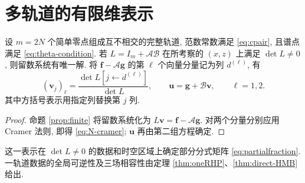 \section{多轨道的有限维表示}
\begin{proposition}[多轨道留数系统的行列式表示]\label{prop:N-algebra}
设 $m=2N$ 个简单零点组成互不相交的完整轨道, 范数常数满足 \eqref{eq:cpair}, 且谱点满足 \eqref{eq:theta-condition}. 若 $L=I_m+\mathcal A\mathcal B$ 在所考察的 $(x,z)$ 上满足 $\det L\ne0$, 则留数系统有唯一解. 将 $\boldsymbol f-\mathcal A\boldsymbol g$ 的第 $\ell$ 个向量分量记为列 $d^{(\ell)}$, 有
\begin{equation}\label{eq:N-cramer}
(\mathbf v_j)_\ell=\dfrac{\det L[j\leftarrow d^{(\ell)}]}{\det L},\qquad
\boldsymbol u=\boldsymbol g+\mathcal B\boldsymbol v,\qquad \ell=1,2.
\end{equation}
其中方括号表示用指定列替换第 $j$ 列.
\end{proposition}
\begin{proof}
命题 \ref{prop:finite} 将留数系统化为 $L\boldsymbol v=\boldsymbol f-\mathcal A\boldsymbol g$. 对两个分量分别应用 Cramer 法则, 即得 \eqref{eq:N-cramer}; $\boldsymbol u$ 再由第二组方程确定.
\end{proof}
这一表示在 $\det L\ne0$ 的数据和时空区域上确定部分分式矩阵 \eqref{eq:partialfraction}. 一轨道数据的全局可逆性及三场相容性由定理 \ref{thm:oneRHP}、\ref{thm:direct-HMB} 给出.
